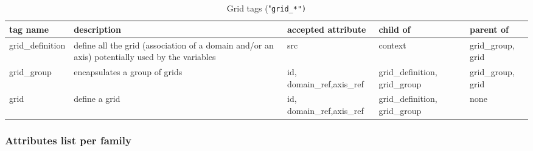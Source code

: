 \documentclass[../tex_main/NEMO_manual]{subfiles}
\begin{document}
\begin{table} \scriptsize
	\begin{tabularx}{\textwidth}{|l|X|X|X|X|} \hline
	tag name                                                                                     &
	description                                                                                  &
	accepted attribute                                                                           &
	child of                                                                                     &
	parent of                       \\ \hline \hline
	grid\_definition                                                                               &
	define all the grid (association of a domain and/or an axis) potentially used by the variables &
	src                                                                                            &
	context                                                                                        &
	grid\_group, grid	\\ \hline
	grid\_group                                                                                    &
	encapsulates a group of grids                                                                  &
	id, domain\_ref,axis\_ref                                                                      &
	grid\_definition, grid\_group                                                                  &
	grid\_group, grid	\\ \hline
   grid                                                                                           &
	define a grid                                                                                  &
	id, domain\_ref,axis\_ref                                                                      &
	grid\_definition, grid\_group                                                                  &
	none 					\\ \hline
	\end{tabularx}
	\caption{Grid tags ("\tt{grid\_*}")}
\end{table}

\subsubsection{Attributes list per family}
\end{document}
